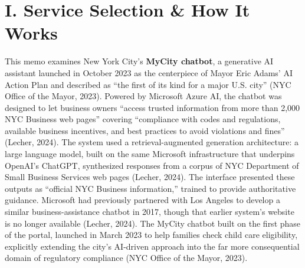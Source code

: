 \documentclass[10pt, twocolumn]{article}
\begin{document}

\section*{I. Service Selection \& How It Works}

This memo examines New York City's \textbf{MyCity chatbot}, a generative AI assistant launched in October 2023 as the centerpiece of Mayor Eric Adams' AI Action Plan and described as ``the first of its kind for a major U.S. city'' (NYC Office of the Mayor, 2023). Powered by Microsoft Azure AI, the chatbot was designed to let business owners ``access trusted information from more than 2,000 NYC Business web pages'' covering ``compliance with codes and regulations, available business incentives, and best practices to avoid violations and fines'' (Lecher, 2024). The system used a retrieval-augmented generation architecture: a large language model, built on the same Microsoft infrastructure that underpins OpenAI's ChatGPT, synthesized responses from a corpus of NYC Department of Small Business Services web pages (Lecher, 2024). The interface presented these outputs as ``official NYC Business information,'' trained to provide authoritative guidance. Microsoft had previously partnered with Los Angeles to develop a similar business-assistance chatbot in 2017, though that earlier system's website is no longer available (Lecher, 2024). The MyCity chatbot built on the first phase of the portal, launched in March 2023 to help families check child care eligibility, explicitly extending the city's AI-driven approach into the far more consequential domain of regulatory compliance (NYC Office of the Mayor, 2023).
\end{document}

